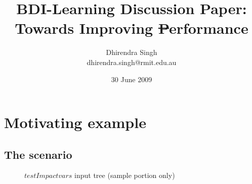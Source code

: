 \documentclass[a4paper]{article}
\title{BDI-Learning Discussion Paper:\\ Towards Improving \st Performance}
\author{
Dhirendra Singh\\ 
dhirendra.singh@rmit.edu.au\\
}
\begin{document}
\date{30 June 2009}

\maketitle

\setcounter{tocdepth}{2} 
\tableofcontents 

\section{Motivating example}

\subsection{The scenario}
\begin{figure}[htbp]
   \centering
{}
   \caption{$testImpactvars$ input tree (sample portion only)}
   \label{fig:testImpactvarsTree}
\end{figure}
\end{document}
